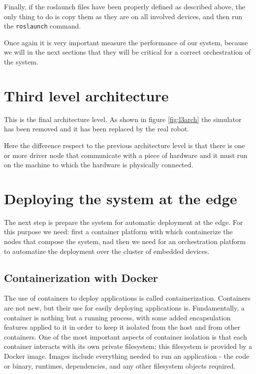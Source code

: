 Finally, if the roslaunch files have been properly defined as described above, the only thing to do is copy them as they are on all involved devices, and then run the \texttt{roslaunch} command.




Once again it is very important measure the performance of our system, because we will in the next sections that they will be critical for a correct orchestration of the system.


\section{Third level architecture}
This is the final architecture level. As shown in figure \ref{fig:l3arch} the simulator has been removed and it has been replaced by the real robot.


Here the difference respect to the previous architecture level is that there is one or more driver node that communicate with a piece of hardware and it must run on the machine to which the hardware is physically connected.






\section{Deploying the system at the edge}
The next step is prepare the system for automatic deployment at the edge. For this purpose we need: first a container platform with which containerize the nodes that compose the system, nad then we need for an orchestration platform to automatize the deployment over the cluster of embedded devices.

\subsection{Containerization with Docker}
The use of containers to deploy applications is called containerization. Containers are not new, but their use for easily deploying applications is.
Fundamentally, a container is nothing but a running process, with some added encapsulation features applied to it in order to keep it isolated from the host and from other containers. One of the most important aspects of container isolation is that each container interacts with its own private filesystem; this filesystem is provided by a Docker image. Images include everything needed to run an application - the code or binary, runtimes, dependencies, and any other filesystem objects required.

